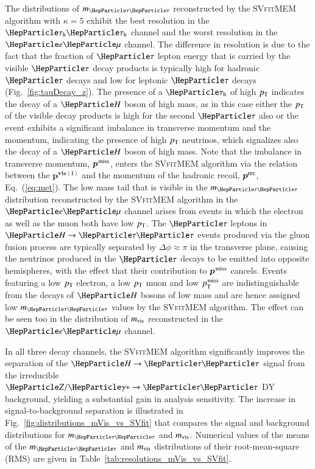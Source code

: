 The distributions of $m_{\Pgt\Pgt}$ reconstructed by the
\textsc{SVfitMEM} algorithm with $\kappa = 5$ exhibit the best
resolution in the $\tauh\tauh$ channel and the worst resolution in the $\Pe\Pgm$ channel.
The difference in resolution is due to the fact that the fraction of
$\Pgt$ lepton energy that is carried by the visible $\Pgt$ decay
products is typically high for hadronic $\Pgt$ decays
and low for leptonic $\Pgt$ decays (\cf Fig.~\ref{fig:tauDecay_z}).
The presence of a $\tauh$ of high $p_{\textrm{T}}$ indicates the decay of a $\PHiggs$ boson of high mass,
as in this case either the $p_{\textrm{T}}$ of the visible decay products is high
for the second $\Pgt$ also or the event exhibits a significant
imbalance in transverse momentum and the momentum,
indicating the presence of high $p_{\textrm{T}}$ neutrinos, which signalizes also the decay of a $\PHiggs$ boson of high mass.
Note that the imbalance in transverse momentum, $\bm{p}^{\textrm{\kern0.10em miss}}$, enters the
\textsc{SVfitMEM} algorithm via the relation between the
$\bm{p^{vis(i)}}$ and the momentum of the hadronic recoil, $\bm{p^{\textrm{rec}}}$, \cf Eq.~(\ref{eq:met}).
The low mass tail that is visible in the $m_{\Pgt\Pgt}$ distribution
reconstructed by the \textsc{SVfitMEM} algorithm in the $\Pe\Pgm$
channel arises from events in which the electron as well as the muon
both have low $p_{\textrm{T}}$.
The $\Pgt$ leptons in $\PHiggs \to \Pgt\Pgt$ events produced via the
gluon fusion process are typically separated by $\Delta\phi \approx
\pi$ in the transverse plane,
causing the neutrinos produced in the $\Pgt$ decays to be emitted into
opposite hemispheres, with the effect that their contribution to $\bm{p}^{\textrm{\kern0.10em miss}}$ cancels.
Events featuring a low $p_{\textrm{T}}$ electron, a low $p_{\textrm{T}}$ muon and low $p_{\textrm{T}}^{\textrm{\kern0.10em miss}}$
are indistinguishable from the decays of $\PHiggs$ bosons of low mass
and are hence assigned low $m_{\Pgt\Pgt}$ values by the \textsc{SVfitMEM} algorithm.
The effect can be seen too in the distribution of $m_{\textrm{vis}}$ 
reconstructed in the $\Pe\Pgm$ channel.

In all three decay channels, the \textsc{SVfitMEM} algorithm significantly improves the separation of the $\PHiggs \to \Pgt\Pgt$ signal 
from the irreducible $\PZ/\Pggx \to \Pgt\Pgt$ DY background, yielding a substantial gain in analysis sensitivity.
The increase in signal-to-background separation is illustrated in Fig.~\ref{fig:distributions_mVis_vs_SVfit}
that compares the signal and background distributions for $m_{\Pgt\Pgt}$ and $m_{\textrm{vis}}$.
Numerical values of the means of the $m_{\Pgt\Pgt}$ and $m_{\textrm{vis}}$
distributions of their root-mean-square (RMS) are given in
Table~\ref{tab:resolutions_mVis_vs_SVfit}.

